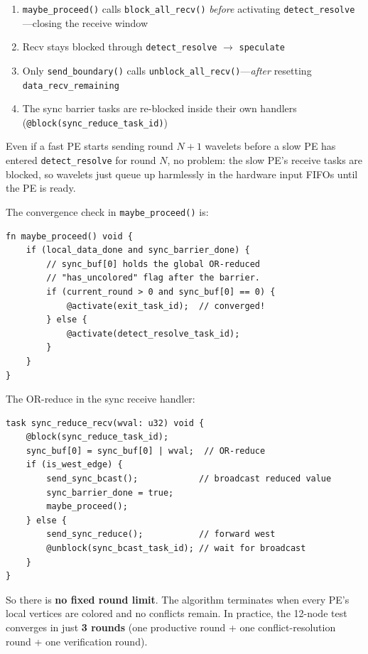 \documentclass[11pt,letterpaper]{article}
\begin{document}
\begin{enumerate}[nosep]
  \item \texttt{maybe\_proceed()} calls \texttt{block\_all\_recv()} \emph{before} activating \texttt{detect\_resolve}---closing the receive window
  \item Recv stays blocked through \texttt{detect\_resolve} $\to$ \texttt{speculate}
  \item Only \texttt{send\_boundary()} calls \texttt{unblock\_all\_recv()}---\emph{after} resetting \texttt{data\_recv\_remaining}
  \item The sync barrier tasks are re-blocked inside their own handlers (\texttt{@block(sync\_reduce\_task\_id)})
\end{enumerate}

Even if a fast PE starts sending round $N{+}1$ wavelets before a slow PE has entered \texttt{detect\_resolve} for round $N$, no problem: the slow PE's receive tasks are blocked, so wavelets just queue up harmlessly in the hardware input FIFOs until the PE is ready.

The convergence check in \texttt{maybe\_proceed()} is:

\begin{lstlisting}[language=CSL, caption={Convergence-aware barrier completion}, label=lst:converge]
fn maybe_proceed() void {
    if (local_data_done and sync_barrier_done) {
        // sync_buf[0] holds the global OR-reduced
        // "has_uncolored" flag after the barrier.
        if (current_round > 0 and sync_buf[0] == 0) {
            @activate(exit_task_id);  // converged!
        } else {
            @activate(detect_resolve_task_id);
        }
    }
}
\end{lstlisting}

The OR-reduce in the sync receive handler:

\begin{lstlisting}[language=CSL, caption={OR-reduce in barrier receive}, label=lst:orreduce]
task sync_reduce_recv(wval: u32) void {
    @block(sync_reduce_task_id);
    sync_buf[0] = sync_buf[0] | wval;  // OR-reduce
    if (is_west_edge) {
        send_sync_bcast();            // broadcast reduced value
        sync_barrier_done = true;
        maybe_proceed();
    } else {
        send_sync_reduce();           // forward west
        @unblock(sync_bcast_task_id); // wait for broadcast
    }
}
\end{lstlisting}

So there is \textbf{no fixed round limit}. The algorithm terminates when every PE's local vertices are colored and no conflicts remain. In practice, the 12-node test converges in just \textbf{3 rounds} (one productive round + one conflict-resolution round + one verification round).
\end{document}
